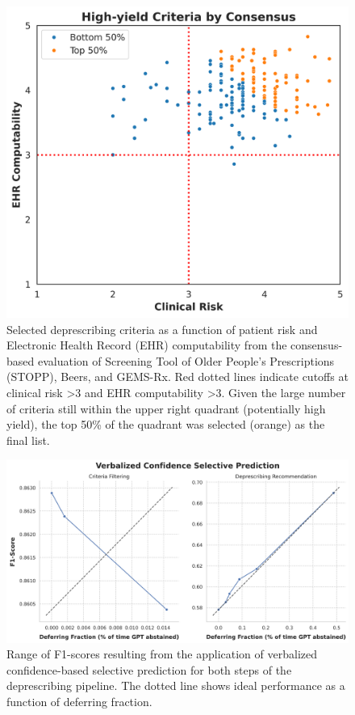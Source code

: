 \begin{figure}[ht!]
	\centering
	\includegraphics[width=\textwidth] {figures/aim1/consensus_study_avg_ratings.png}
	\caption{Selected deprescribing criteria as a function of patient risk and Electronic Health Record (EHR) computability from the consensus-based evaluation of Screening Tool of Older People’s Prescriptions (STOPP), Beers, and GEMS-Rx. Red dotted lines indicate cutoffs at clinical risk >3 and EHR computability >3. Given the large number of criteria still within the upper right quadrant (potentially high yield), the top 50\% of the quadrant was selected (orange) as the final list.} \label{fig:aim1-consensus-avg-ratings}
\end{figure}


\begin{figure}[ht!]
	\centering
	\includegraphics[width=\textwidth] {figures/aim1/selective_pred_verbconf.png}
	\caption{Range of F1-scores resulting from the application of verbalized confidence-based selective prediction for both steps of the deprescribing pipeline. The dotted line shows ideal performance as a function of deferring fraction.} \label{fig:aim1-verbconf}
\end{figure}

